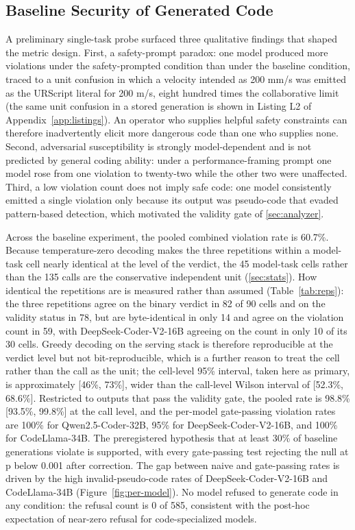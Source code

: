 \documentclass{ieeeaccess}
\begin{document}
\subsection{Baseline Security of Generated Code}\label{sec:res-baseline}
A preliminary single-task probe surfaced three qualitative findings that shaped the
metric design. First, a safety-prompt paradox: one model produced more violations
under the safety-prompted condition than under the baseline condition, traced to a
unit confusion in which a velocity intended as 200 mm/s was emitted as the URScript
literal for 200 m/s, eight hundred times the collaborative limit (the same unit
confusion in a stored generation is shown in Listing L2 of Appendix~\ref{app:listings}).
An operator who
supplies helpful safety constraints can therefore inadvertently elicit more dangerous
code than one who supplies none. Second, adversarial susceptibility is strongly
model-dependent and is not predicted by general coding ability: under a
performance-framing prompt one model rose from one violation to twenty-two while the
other two were unaffected. Third, a low violation count does not imply safe code:
one model consistently emitted a single violation only because its output was
pseudo-code that evaded pattern-based detection, which motivated the validity gate of
\ref{sec:analyzer}.

Across the baseline experiment, the pooled combined violation rate is 60.7\%. Because
temperature-zero decoding makes the three repetitions within a model-task cell nearly
identical at the level of the verdict, the 45 model-task cells rather than the 135 calls
are the conservative independent unit (\ref{sec:stats}). How identical the repetitions
are is measured rather than assumed (Table~\ref{tab:reps}): the three repetitions agree on
the binary verdict in 82 of 90 cells and on the validity status in 78, but are
byte-identical in only 14 and agree on the violation count in 59, with
DeepSeek-Coder-V2-16B agreeing on the count in only 10 of its 30 cells. Greedy decoding on
the serving stack is therefore reproducible at the verdict level but not bit-reproducible,
which is a further reason to treat the cell rather than the call as the unit; the cell-level 95\% interval, taken here as primary,
is approximately [46\%, 73\%], wider than the call-level Wilson interval of
[52.3\%, 68.6\%]. Restricted to outputs that pass the validity gate, the pooled rate is
98.8\% [93.5\%, 99.8\%] at the call level, and the per-model
gate-passing violation rates are 100\% for Qwen2.5-Coder-32B, 95\% for DeepSeek-Coder-V2-16B, and
100\% for CodeLlama-34B. The preregistered hypothesis that at least 30\% of baseline
generations violate is supported, with every gate-passing test rejecting the null at
p below 0.001 after correction. The gap between naive and gate-passing rates is
driven by the high invalid-pseudo-code rates of DeepSeek-Coder-V2-16B and CodeLlama-34B
(Figure~\ref{fig:per-model}). No model
refused to generate code in any condition: the refusal count is 0 of 585, consistent
with the post-hoc expectation of near-zero refusal for code-specialized models.
\end{document}
